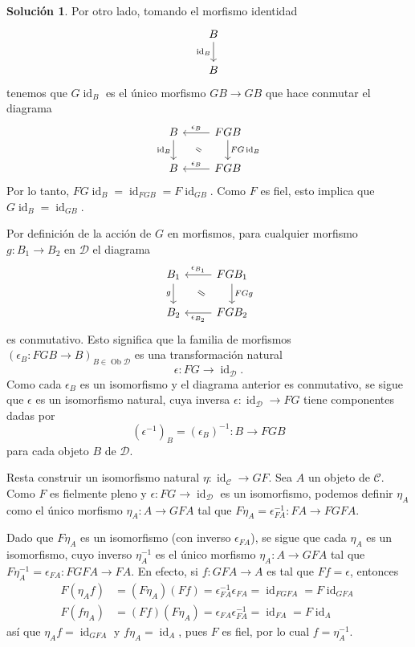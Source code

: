 \documentclass[12pt,letterpaper,titlepage]{article}
\theoremstyle{definition}
\newtheorem*{sol}{Solución}
\renewcommand\cal[1]{\mathcal{#1}}
\newcommand\com[2]{\ar[equal,from={#1},to={#2},shorten=5mm]}
\newcommand\<{\langle}
\renewcommand\>{\rangle}
\DeclareMathOperator{\Ob}{Ob}
\DeclareMathOperator{\id}{id}
\begin{document}
\begin{sol}
    Por otro lado, tomando el morfismo identidad
    \[
        \begin{tikzcd}
            B \ar[d,"\id_B"'] \\
            B
        \end{tikzcd}
    \]
    tenemos que $G\id_B$ es el único morfismo $GB\to GB$ que hace conmutar
    el diagrama
    \[
        \begin{tikzcd}
            B \ar[d,"\id_B"'] & FGB \ar[l,"\epsilon_B"'] \ar[d,"FG\id_B"] \\
            B & FGB \ar[l,"\epsilon_B"']
            \com{1-1}{2-2}
        \end{tikzcd}
    \]
    Por lo tanto, $FG\id_B=\id_{FGB}=F\id_{GB}$.
    Como $F$ es fiel, esto implica que $G\id_B =\id_{GB}$.
    
    Por definición de la acción de $G$ en morfismos, para cualquier morfismo
    $g:B_1\to B_2$ en $\cal D$ el diagrama
    \[
        \begin{tikzcd}
            B_1 \ar[d,"g"']
            & FGB_1 \ar[l,"\epsilon_{B_1}"'] \ar[d,"FGg"] \\
            B_2 & FGB_2 \ar[l,"\epsilon_{B_2}"]
            \com{1-1}{2-2}
        \end{tikzcd}
    \]
    es conmutativo.
    Esto significa que la familia de morfismos $(\epsilon_B:FGB\to B)_{B\in\Ob\cal D}$
    es una transformación natural
    \[
        \epsilon : FG\to \id_{\cal D}
    .\]
    Como cada $\epsilon_B$ es un isomorfismo y el diagrama anterior
    es conmutativo, se sigue que $\epsilon$ es un
    isomorfismo natural, cuya inversa
    $\epsilon:\id_{\cal D}\to FG$ tiene componentes dadas por
    \[
        (\epsilon^{-1})_B = (\epsilon_B)^{-1}:B\to FGB
    \]
    para cada objeto $B$ de $\cal D$.
    
    Resta construir un isomorfismo natural $\eta:\id_{\cal C}\to GF$.
    Sea $A$ un objeto de $\cal C$.
    Como $F$ es fielmente pleno y $\epsilon:FG\to\id_{\cal D}$ es un
    isomorfismo, podemos definir $\eta_A$ como el único morfismo
    $\eta_A:A\to GFA$ tal que $F\eta_A=\epsilon_{FA}^{-1}:FA\to FGFA$.
    
    Dado que $F\eta_A$ es un isomorfismo (con inverso $\epsilon_{FA}$),
    se sigue que cada $\eta_A$ es un isomorfismo, cuyo inverso $\eta_A^{-1}$ es el
    único morfismo $\eta_A:A\to GFA$ tal que $F\eta_A^{-1}=\epsilon_{FA}:FGFA\to FA$.
    En efecto, si $f:GFA\to A$ es tal que $Ff=\epsilon$, entonces
    \begin{align*}
        F(\eta_Af)
        &=(F\eta_A)(Ff)=\epsilon_{FA}^{-1}\epsilon_{FA}=\id_{FGFA}=F\id_{GFA} \\
        F(f\eta_A)
        &=(Ff)(F\eta_A)=\epsilon_{FA}\epsilon_{FA}^{-1}=\id_{FA}=F\id_A
    \end{align*}
    así que $\eta_Af=\id_{GFA}$ y $f\eta_A=\id_A$, pues $F$ es fiel,
    por lo cual $f=\eta_A^{-1}$.
    

\end{sol}
\end{document}
